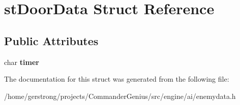\hypertarget{structst_door_data}{
\section{stDoorData Struct Reference}
\label{structst_door_data}
}
\subsection*{Public Attributes}
\begin{DoxyCompactItemize}
\item 
\hypertarget{structst_door_data_a8869349ec65fdad1241cf49f5a35b22d}{
char {\bfseries timer}}
\label{structst_door_data_a8869349ec65fdad1241cf49f5a35b22d}

\end{DoxyCompactItemize}


The documentation for this struct was generated from the following file:\begin{DoxyCompactItemize}
\item 
/home/gerstrong/projects/CommanderGenius/src/engine/ai/enemydata.h\end{DoxyCompactItemize}
